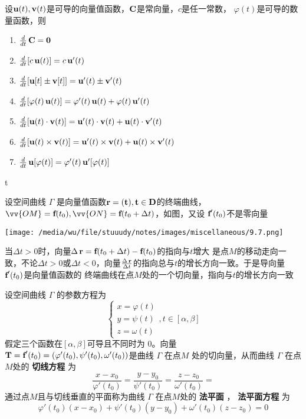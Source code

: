\documentclass[11pt]{article}
\begin{document}
设\(\operatorname{\textbf{u}}(t),\operatorname{\textbf{v}}(t)\)是可导的向量值函数，\(\operatorname{\textbf{C}}\)是常向量，\(c\)是任一常数，
\(\varphi(t)\)是可导的数量函数，则
\begin{enumerate}
\item \(\frac{d}{dt}\operatorname{\textbf{C}}=\mathbf{0}\)
\item \(\frac{d}{dt}[c\operatorname{\textbf{u}}(t)]=c\operatorname{\textbf{u}}'(t)\)
\item \(\frac{d}{dt}[\operatorname{\textbf{u}}[t]\pm\operatorname{\textbf{v}}[t]]=\operatorname{\textbf{u}}'(t)\pm\operatorname{\textbf{v}}'(t)\)
\item \(\frac{d}{dt}[\varphi(t)\operatorname{\textbf{u}}(t)]=\varphi'(t)\operatorname{\textbf{u}}(t)+\varphi(t)\operatorname{\textbf{u}}'(t)\)
\item \(\frac{d}{dt}[\operatorname{\textbf{u}}(t)\cdot\operatorname{\textbf{v}}(t)]=\operatorname{\textbf{u}}'(t)\cdot\operatorname{\textbf{v}}(t)+\operatorname{\textbf{u}}(t)\cdot\operatorname{\textbf{v}}'(t)\)
\item \(\frac{d}{dt}[\operatorname{\textbf{u}}(t)\times\operatorname{\textbf{v}}(t)]=\operatorname{\textbf{u}}'(t)\times\operatorname{\textbf{v}}(t)+\operatorname{\textbf{u}}(t)\times\operatorname{\textbf{v}}'(t)\)
\item \(\frac{d}{dt}\operatorname{\textbf{u}}[\varphi(t)]=\varphi'(t)\operatorname{\textbf{u}}'[\varphi(t)]\)
\end{enumerate}

t

设空间曲线 \(\Gamma\) 是向量值函数\(\operatorname{\textbf{r}}=\bf(t),t\in D\)的终端曲线，
\(\vv{OM}=\bff(t_0),\vv{ON}=\bff(t_0+\Delta t)\)，如图，又设
\(\operatorname{\textbf{f}}'(t_0)\)不是零向量

\begin{center}
\texttt{[image: /media/wu/file/stuuudy/notes/images/miscellaneous/9.7.png]}
\end{center}

当\(\Delta t>0\)时，向量\(\Delta \operatorname{\textbf{r}}=\operatorname{\textbf{f}}(t_0+\Delta t)-\operatorname{\textbf{f}}(t_0)\)的指向与\(t\)增大
是点\(M\)的移动走向一致，不论\(\Delta t>0\)或\(\Delta t<0\)，向量\(\frac{\Delta \operatorname{\textbf{r}}}{\Delta
      t}\)的指向总与\(t\)的增长方向一致。于是导向量\(\operatorname{\textbf{f}}'(t_0)\)是向量值函数的
   终端曲线在点\(M\)处的一个切向量，指向与\(t\)的增长方向一致


设空间曲线 \(\Gamma\) 的参数方程为
\begin{equation*}
\begin{cases}
x=\varphi(t)\\
y=\psi(t)\\
z=\omega(t)
\end{cases},t\in[\alpha,\beta]
\end{equation*}
假定三个函数在\([\alpha,\beta]\)可导且不同时为 0。向量
\(\operatorname{\textbf{T}}=\operatorname{\textbf{f}}'(t_0)=(\varphi'(t_0),\psi'(t_0),\omega'(t_0))\)是曲线 \(\Gamma\) 在点\(M\)
处的切向量，从而曲线 \(\Gamma\) 在点\(M\)处的 \textbf{切线方程} 为
\begin{equation*}
\frac{x-x_0}{\varphi'(t_0)}=
\frac{y-y_0}{\psi'(t_0)}=
\frac{z-z_0}{\omega'(t_0)}=
\end{equation*}
通过点\(M\)且与切线垂直的平面称为曲线 \(\Gamma\) 在点\(M\)处的 \textbf{法平面} ， \textbf{法平面方程} 为
\begin{equation*}
\varphi'(t_0)(x-x_0)+\psi'(t_0)(y-y_0)+\omega'(t_0)(z-z_0)=0
\end{equation*}
\end{document}
